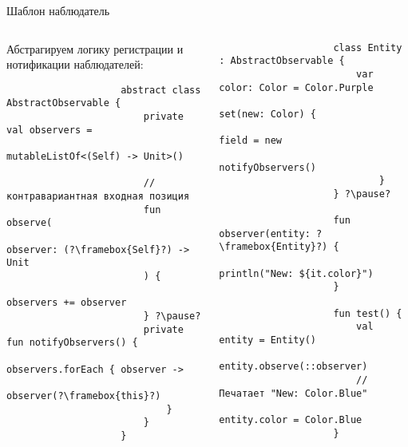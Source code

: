 \documentclass[aspectratio=169,usenames,dvipsnames]{beamer}
\begin{document}
    \begin{frame}[fragile]{Шаблон наблюдатель}
        \begin{columns}
            \begin{column}{0.48\textwidth}
                Абстрагируем логику регистрации и нотификации наблюдателей:
                \begin{verbatim}
                    abstract class AbstractObservable {
                        private val observers =
                            mutableListOf<(Self) -> Unit>()

                        // контравариантная входная позиция
                        fun observe(
                            observer: (?\framebox{Self}?) -> Unit
                        ) {
                            observers += observer
                        } ?\pause?
                        private fun notifyObservers() {
                            observers.forEach { observer ->
                                observer(?\framebox{this}?)
                            }
                        }
                    }
                \end{verbatim}
            \end{column}
            \pause
            \begin{column}{0.49\textwidth}
                \vspace{-0.5em}
                \begin{verbatim}
                    class Entity : AbstractObservable {
                        var color: Color = Color.Purple
                            set(new: Color) {
                                field = new
                                notifyObservers()
                            }
                    } ?\pause?

                    fun observer(entity: ?\framebox{Entity}?) {
                        println("New: ${it.color}")
                    }

                    fun test() {
                        val entity = Entity()
                        entity.observe(::observer)
                        // Печатает "New: Color.Blue"
                        entity.color = Color.Blue
                    }
                \end{verbatim}
            \end{column}
        \end{columns}
    \end{frame}
\end{document}
